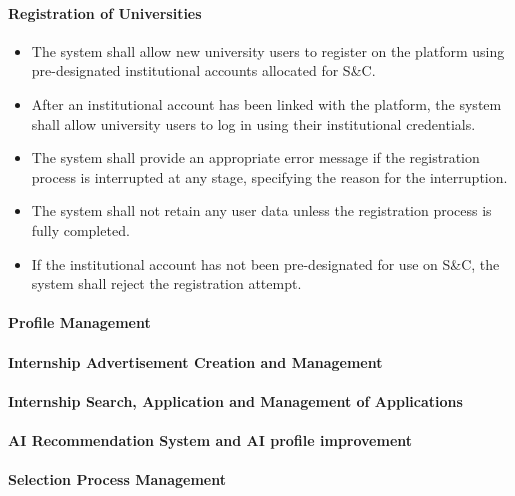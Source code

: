 \paragraph{Registration of Universities}
\begin{itemize}[label={[\textbf{FR}]}, align=left, leftmargin=*]
     \item {} The system shall allow new university users to register on the platform using pre-designated institutional accounts allocated for S\&C.
    \item {} After an institutional account has been linked with the platform, the system shall allow university users to log in using their institutional credentials.
    \item {} The system shall provide an appropriate error message if the registration process is interrupted at any stage, specifying the reason for the interruption.
    \item {} The system shall not retain any user data unless the registration process is fully completed.
    \item {} If the institutional account has not been pre-designated for use on S\&C, the system shall reject the registration attempt.
\end{itemize}


\paragraph{Profile Management}

\paragraph{Internship Advertisement Creation and Management}

\paragraph{Internship Search, Application and Management of Applications}

\paragraph{AI Recommendation System and AI profile improvement}

\paragraph{Selection Process Management}

